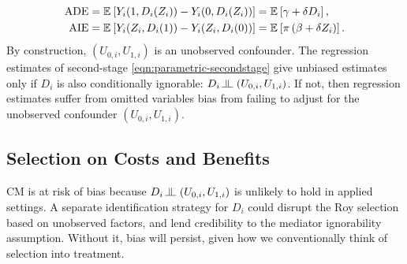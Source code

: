 \begin{align*}
    \text{ADE}
    = \mathbb{E}_{} \left[ Y_i(1, D_i(Z_i)) - Y_i(0, D_i(Z_i)) \right]
        &= \mathbb{E}_{} \left[ \gamma + \delta D_i \right], \\
    \text{AIE} 
    = \mathbb{E}_{} \left[ Y_i(Z_i, D_i(1)) - Y_i(Z_i, D_i(0)) \right]
        &= \mathbb{E}_{} \left[  \pi \left( \beta +  \delta Z_i \right) \right].
\end{align*}
By construction, $\left(U_{0, i}, U_{1, i} \right)$ is an unobserved confounder.
The regression estimates of second-stage \eqref{eqn:parametric-secondstage} give unbiased estimates only if $D_i$ is also conditionally ignorable: $D_i \indep  \left(U_{0, i}, U_{1, i} \right)$.
If not, then regression estimates suffer from omitted variables bias from failing to adjust for the unobserved confounder $\left(U_{0, i}, U_{1, i} \right)$.

\subsection{Selection on Costs and Benefits}
CM is at risk of bias because $D_i \indep  \left(U_{0, i}, U_{1, i} \right)$ is unlikely to hold in applied settings.
A separate identification strategy for $D_i$ could disrupt the Roy selection based on unobserved factors, and lend credibility to the mediator ignorability assumption.
Without it, bias will persist, given how we conventionally think of selection into treatment.

